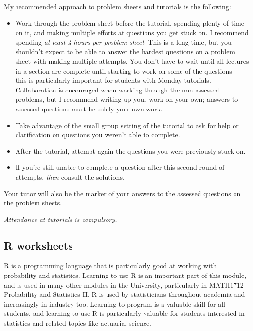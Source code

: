 \documentclass[
  letterpaper,
  DIV=11,
  numbers=noendperiod]{scrreprt}
\providecommand{\tightlist}{%
  \setlength{\itemsep}{0pt}\setlength{\parskip}{0pt}}\usepackage{longtable,booktabs,array}
\theoremstyle{remark}
\begin{document}
My recommended approach to problem sheets and tutorials is the
following:

\begin{itemize}
\tightlist
\item
  Work through the problem sheet before the tutorial, spending plenty of
  time on it, and making multiple efforts at questions you get stuck on.
  I recommend spending \emph{at least 4 hours per problem sheet}. This
  is a long time, but you shouldn't expect to be able to answer the
  hardest questions on a problem sheet with making multiple attempts.
  You don't have to wait until all lectures in a section are complete
  until starting to work on some of the questions -- this is
  particularly important for students with Monday tutorials.
  Collaboration is encouraged when working through the non-assessed
  problems, but I recommend writing up your work on your own; answers to
  assessed questions must be solely your own work.
\item
  Take advantage of the small group setting of the tutorial to ask for
  help or clarification on questions you weren't able to complete.
\item
  After the tutorial, attempt again the questions you were previously
  stuck on.
\item
  If you're still unable to complete a question after this second round
  of attempts, \emph{then} consult the solutions.
\end{itemize}

Your tutor will also be the marker of your answers to the assessed
questions on the problem sheets.

\emph{Attendance at tutorials is compulsory.}

\hypertarget{r-worksheets}{%
\subsection*{R worksheets}\label{r-worksheets}}

R is a programming language that is particularly good at working with
probability and statistics. Learning to use R is an important part of
this module, and is used in many other modules in the University,
particularly in MATH1712 Probability and Statistics II. R is used by
statisticians throughout academia and increasingly in industry too.
Learning to program is a valuable skill for all students, and learning
to use R is particularly valuable for students interested in statistics
and related topics like actuarial science.
\end{document}
